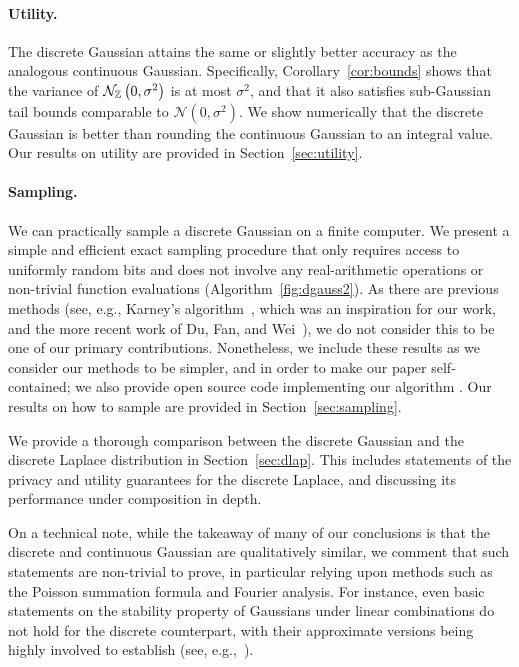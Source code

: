 \documentclass{jpcfinal} %
\newcommand{\dgausss}[2]{{\discN\left(#1,#2\right)}}
\newcommand{\dgauss}[1]{\dgausss{0}{#1}}
\begin{document}
\paragraph{Utility.} The discrete Gaussian attains the same or slightly better accuracy as the analogous continuous Gaussian. Specifically, Corollary~\ref{cor:bounds} shows that the variance of $\dgauss{\sigma^2}$ is at most $\sigma^2$, and that it also satisfies sub-Gaussian tail bounds comparable to $\mathcal{N}(0,\sigma^2)$. We show numerically that the discrete Gaussian is better than rounding the continuous Gaussian to an integral value. Our results on utility are provided in Section~\ref{sec:utility}.

\paragraph{Sampling.} We can practically sample a discrete Gaussian on a finite computer. We present a simple and efficient exact sampling procedure that only requires access to uniformly random bits and does not involve any real-arithmetic operations or non-trivial function evaluations (Algorithm~\ref{fig:dgauss2}). As there are previous methods (see, e.g., Karney's algorithm~\citep{Karney16}, which was an inspiration for our work, and the more recent work of Du, Fan, and Wei~\citep{DuFW20}), we do not consider this to be one of our primary contributions. Nonetheless, we include these results as we consider our methods to be simpler, and in order to make our paper self-contained; we also provide open source code implementing our algorithm \citep{DGaussGithub}. Our results on how to sample are provided in Section~\ref{sec:sampling}.

We provide a thorough comparison between the discrete Gaussian and the discrete Laplace distribution in Section~\ref{sec:dlap}. This includes statements of the privacy and utility guarantees for the discrete Laplace, and discussing its performance under composition in depth. 

On a technical note, while the takeaway of many of our conclusions is that the discrete and continuous Gaussian are qualitatively similar, we comment that such statements are non-trivial to prove, in particular relying upon methods such as the Poisson summation formula and Fourier analysis. For instance, even basic statements on the stability property of Gaussians under linear combinations do not hold for the discrete counterpart, with their approximate versions being highly involved to establish (see, e.g.,~\citep{AggarwalR16}).
\end{document}
